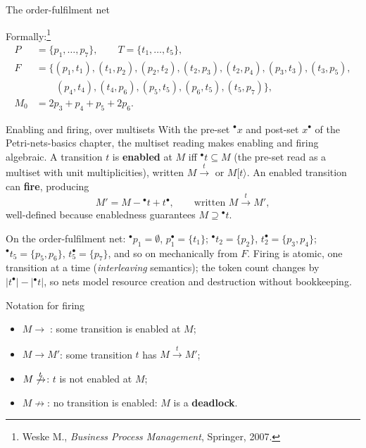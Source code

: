 \begin{examplebox}{The order-fulfilment net}
\begin{center}
{}
\end{center}
Formally:\footnote{Weske M., \emph{Business Process Management}, Springer, 2007.}
\begin{align*}
  P &= \{p_1, \ldots, p_7\}, \qquad T = \{t_1, \ldots, t_5\}, \\
  F &= \{(p_1, t_1), (t_1, p_2), (p_2, t_2), (t_2, p_3), (t_2, p_4), (p_3, t_3), (t_3, p_5),\\
    &\qquad (p_4, t_4), (t_4, p_6), (p_5, t_5), (p_6, t_5), (t_5, p_7)\}, \\
  M_0 &= 2p_3 + p_4 + p_5 + 2p_6.
\end{align*}
\end{examplebox}

\begin{definitionbox}{Enabling and firing, over multisets}
With the pre-set ${}^\bullet x$ and post-set $x^\bullet$ of the Petri-nets-basics chapter, the multiset reading makes enabling and firing algebraic. A transition $t$ is \textbf{enabled} at $M$ iff ${}^\bullet t \subseteq M$ (the pre-set read as a multiset with unit multiplicities), written $M \xrightarrow{t}$ or $M[t\rangle$. An enabled transition can \textbf{fire}, producing
\[
  M' = M - {}^\bullet t + t^\bullet, \qquad \text{written } M \xrightarrow{t} M',
\]
well-defined because enabledness guarantees $M \supseteq {}^\bullet t$.
\end{definitionbox}

On the order-fulfilment net: ${}^\bullet p_1 = \emptyset$, $p_1^\bullet = \{t_1\}$; ${}^\bullet t_2 = \{p_2\}$, $t_2^\bullet = \{p_3, p_4\}$; ${}^\bullet t_5 = \{p_5, p_6\}$, $t_5^\bullet = \{p_7\}$, and so on mechanically from $F$. Firing is atomic, one transition at a time (\emph{interleaving} semantics); the token count changes by $|t^\bullet| - |{}^\bullet t|$, so nets model resource creation and destruction without bookkeeping.

\begin{definitionbox}{Notation for firing}
\begin{itemize}
  \item $M \to\;$: some transition is enabled at $M$;
  \item $M \to M'$: some transition $t$ has $M \xrightarrow{t} M'$;
  \item $M \not\xrightarrow{t}$: $t$ is not enabled at $M$;
  \item $M \not\to$: no transition is enabled: $M$ is a \textbf{deadlock}.
\end{itemize}
\end{definitionbox}


